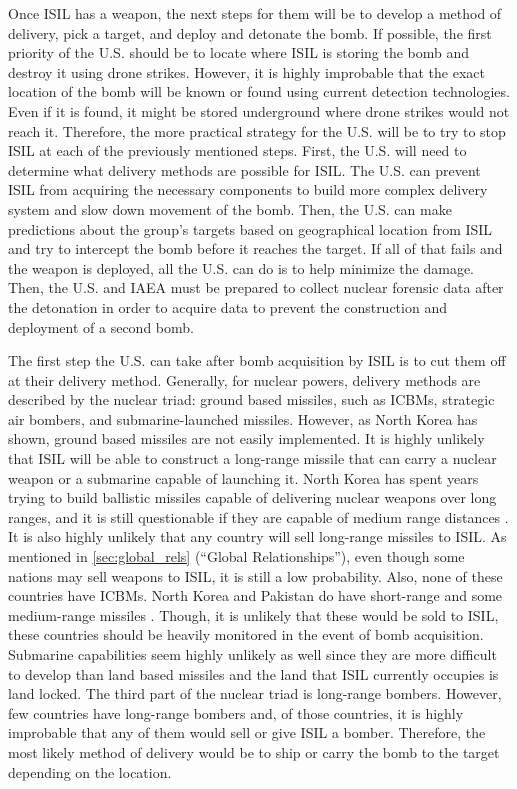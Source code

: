 \documentclass{report}
\begin{document}
Once ISIL has a weapon, the next steps for them will be to develop a method of delivery, pick a target, and deploy and detonate the bomb.  If possible, the first priority of the U.S. should be to locate where ISIL is storing the bomb and destroy it using drone strikes.  However, it is highly improbable that the exact location of the bomb will be known or found using current detection technologies.  Even if it is found, it might be stored underground where drone strikes would not reach it.  Therefore, the more practical strategy for the U.S. will be to try to stop ISIL at each of the previously mentioned steps.   First, the U.S. will need to determine what delivery methods are possible for ISIL.  The U.S. can prevent ISIL from acquiring the necessary components to build more complex delivery system and slow down movement of the bomb.  Then, the U.S. can make predictions about the group's targets based on geographical location from ISIL and try to intercept the bomb before it reaches the target.  If all of that fails and the weapon is deployed, all the U.S. can do is to help minimize the damage.  Then, the U.S. and IAEA must be prepared to collect nuclear forensic data after the detonation in order to acquire data to prevent the construction and deployment of a second bomb.

The first step the U.S. can take after bomb acquisition by ISIL is to cut them off at their delivery method.  Generally, for nuclear powers, delivery methods are described by the nuclear triad: ground based missiles, such as ICBMs, strategic air bombers, and submarine-launched missiles.  However, as North Korea has shown, ground based missiles are not easily implemented.  It is highly unlikely that ISIL will be able to construct a long-range missile that can carry a nuclear weapon or a submarine capable of launching it.  North Korea has spent years trying to build ballistic missiles capable of delivering nuclear weapons over long ranges, and it is still questionable if they are capable of medium range distances \cite{Gladstone2015}.  It is also highly unlikely that any country will sell long-range missiles to ISIL.  As mentioned in \autoref{sec:global_rels} (\enquote{Global Relationships}), even though some nations may sell weapons to ISIL, it is still a low probability.  Also, none of these countries have ICBMs. North Korea and Pakistan do have short-range and some medium-range missiles \cite{Gladstone2015,NuclearThreatInitiative2014}.  Though, it is unlikely that these would be sold to ISIL, these countries should be heavily monitored in the event of bomb acquisition.  Submarine capabilities seem highly unlikely as well since they are more difficult to develop than land based missiles and the land that ISIL currently occupies is land locked.  The third part of the nuclear triad is long-range bombers.  However, few countries have long-range bombers and, of those countries, it is highly improbable that any of them would sell or give ISIL a bomber.  Therefore, the most likely method of delivery would be to ship or carry the bomb to the target depending on the location. 
\end{document}
